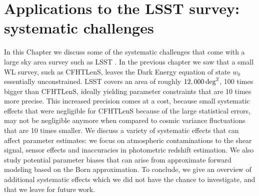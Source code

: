 
\chapter{Applications to the LSST survey: systematic challenges}
\lhead[\fancyplain{}{\thepage}]{\fancyplain{}{\rightmark}}
 \thispagestyle{plain}
\setlength{\parindent}{10mm}
\label{chp:7}

In this Chapter we discuss some of the systematic challenges that come with a large sky area survey such as LSST \citep{LSST}. In the previous chapter we saw that a small WL survey, such as CFHTLenS, leaves the Dark Energy equation of state $w_0$ essentially unconstrained. LSST covers an area of roughly $12,000\,{\rm deg}^2$, 100 times bigger than CFHTLenS, ideally yielding parameter constraints that are 10 times more precise. This increased precision comes at a cost, because small systematic effects that were negligible for CFHTLenS because of the large statistical errors, may not be negligible anymore when compared to cosmic variance fluctuations that are 10 times smaller. We discuss a variety of systematic effects that can affect parameter estimates: we focus on atmospheric contaminations to the shear signal, sensor effects and inaccuracies in photometric redshift estimation. We also study potential parameter biases that can arise from approximate forward modeling based on the Born approximation. To conclude, we give an overview of additional systematic effects which we did not have the chance to investigate, and that we leave for future work.    

